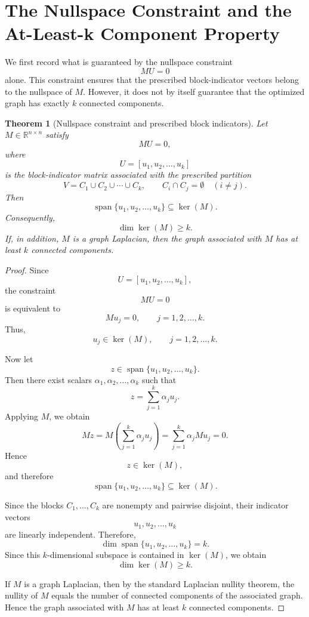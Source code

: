 \documentclass[11pt]{article}
\newtheorem{theorem}{Theorem}[section]
\begin{document}
	
	

	\section{The Nullspace Constraint and the At-Least-k Component Property}
	
	We first record what is guaranteed by the nullspace constraint
	\[
	MU=0
	\]
	alone. This constraint ensures that the prescribed block-indicator vectors belong to the nullspace of $M$. However, it does not by itself guarantee that the optimized graph has exactly $k$ connected components.
	
	\begin{theorem}[Nullspace constraint and prescribed block indicators]
	Let $M\in\mathbb R^{n\times n}$ satisfy
	\[
	MU=0,
	\]
	where
	\[
	U=[u_1,u_2,\ldots,u_k]
	\]
	is the block-indicator matrix associated with the prescribed partition
	\[
	V=C_1\cup C_2\cup\cdots\cup C_k,
	\qquad
	C_i\cap C_j=\emptyset\quad (i\ne j).
	\]
	Then
	\[
	\operatorname{span}\{u_1,u_2,\ldots,u_k\}\subseteq\ker(M).
	\]
	Consequently,
	\[
	\dim\ker(M)\ge k.
	\]
	If, in addition, $M$ is a graph Laplacian, then the graph associated with $M$ has at least $k$ connected components.
	\end{theorem}
	
	\begin{proof}
	Since
	\[
	U=[u_1,u_2,\ldots,u_k],
	\]
	the constraint
	\[
	MU=0
	\]
	is equivalent to
	\[
	Mu_j=0,\qquad j=1,2,\ldots,k.
	\]
	Thus,
	\[
	u_j\in\ker(M),\qquad j=1,2,\ldots,k.
	\]
	
	Now let
	\[
	z\in\operatorname{span}\{u_1,u_2,\ldots,u_k\}.
	\]
	Then there exist scalars $\alpha_1,\alpha_2,\ldots,\alpha_k$ such that
	\[
	z=\sum_{j=1}^{k}\alpha_j u_j.
	\]
	Applying $M$, we obtain
	\[
	Mz
	=
	M\left(\sum_{j=1}^{k}\alpha_j u_j\right)
	=
	\sum_{j=1}^{k}\alpha_j Mu_j
	=
	0.
	\]
	Hence
	\[
	z\in\ker(M),
	\]
	and therefore
	\[
	\operatorname{span}\{u_1,u_2,\ldots,u_k\}\subseteq\ker(M).
	\]
	
	Since the blocks $C_1,\ldots,C_k$ are nonempty and pairwise disjoint, their indicator vectors
	\[
	u_1,u_2,\ldots,u_k
	\]
	are linearly independent. Therefore,
	\[
	\dim\operatorname{span}\{u_1,u_2,\ldots,u_k\}=k.
	\]
	Since this $k$-dimensional subspace is contained in $\ker(M)$, we obtain
	\[
	\dim\ker(M)\ge k.
	\]
	
	If $M$ is a graph Laplacian, then by the standard Laplacian nullity theorem, the nullity of $M$ equals the number of connected components of the associated graph. Hence the graph associated with $M$ has at least $k$ connected components.
	\end{proof}
	
\end{document}
